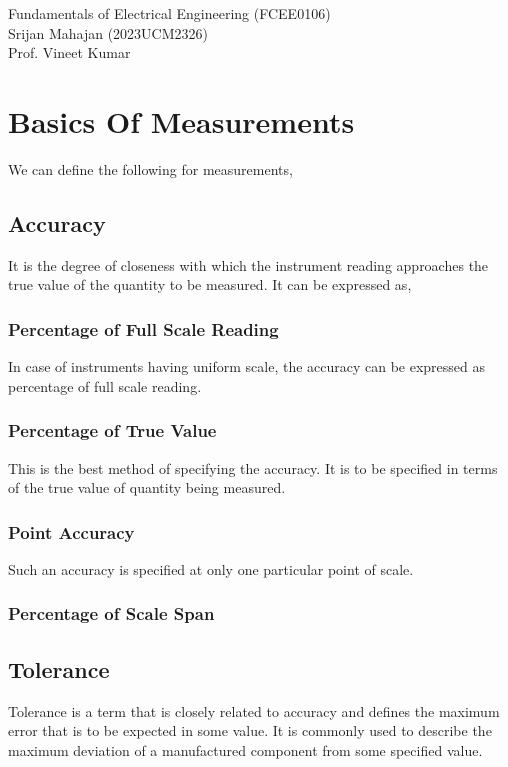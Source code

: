 


	\begin{titlepage}
		\begin{center}
			\Huge{Fundamentals of Electrical Engineering (FCEE0106)}\\
			Srijan Mahajan (2023UCM2326)\\
			Prof. Vineet Kumar
		\end{center}
	\end{titlepage}
	\tableofcontents
	\newpage
	
	\chapter{Basics Of Measurements}
	We can define the following for measurements,
	\section{Accuracy}
	It is the degree of closeness with which the instrument reading approaches the true value of the quantity to be measured. It can be expressed as,
	\subsection{Percentage of Full Scale Reading}
	In case of instruments having uniform scale, the accuracy can be expressed as percentage of full scale reading.
	\subsection{Percentage of True Value}
	This is the best method of specifying the accuracy. It is to be specified in terms of the true value of quantity being measured.
	\subsection{Point Accuracy}
	Such an accuracy is specified at only one particular point of scale.
	\subsection{Percentage of Scale Span}
	\section{Tolerance}
	Tolerance is a term that is closely related to accuracy and defines the maximum error that is to be expected in some value. It is commonly used to describe the maximum deviation of a manufactured component from some specified value.
